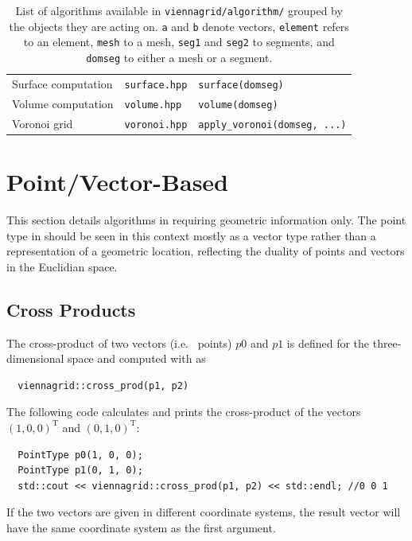 \begin{table}
\begin{tabular}{|l|l|l|}
   Surface computation & \texttt{surface.hpp}            & \lstinline|surface(domseg)| \\
   Volume computation  & \texttt{volume.hpp}             & \lstinline|volume(domseg)| \\
   Voronoi grid        & \texttt{voronoi.hpp}            & \lstinline|apply_voronoi(domseg, ...)| \\
   \hline
 \end{tabular}
 \caption{List of algorithms available in \texttt{viennagrid/algorithm/} grouped by the objects they are acting on.
    \lstinline|a| and \lstinline|b| denote vectors, \lstinline|element| refers to an element,
    \lstinline|mesh| to a mesh, \lstinline|seg1| and \lstinline|seg2| to segments, and \lstinline|domseg| to either a mesh or a segment.}
 \label{tab:algorithms}
\end{table}


\section{Point/Vector-Based}
This section details algorithms in {\ViennaGrid} requiring geometric information only.
The point type in {\ViennaGrid} should be seen in this context mostly as a vector type rather than a representation of a geometric location, reflecting the duality of points and vectors in the Euclidian space.

  \subsection{Cross Products}
 The cross-product of two vectors (i.e.~{\ViennaGrid} points) $p0$ and $p1$ is defined for the three-dimensional space and computed with {\ViennaGrid} as
 \begin{lstlisting}
  viennagrid::cross_prod(p1, p2)
 \end{lstlisting}
 The following code calculates and prints the cross-product of the vectors $(1,0,0)^\mathrm{T}$ and $(0,1,0)^\mathrm{T}$:
 \begin{lstlisting}
  PointType p0(1, 0, 0);
  PointType p1(0, 1, 0);
  std::cout << viennagrid::cross_prod(p1, p2) << std::endl; //0 0 1
 \end{lstlisting}
 If the two vectors are given in different coordinate systems, the result vector will have the same coordinate system as the first argument.


